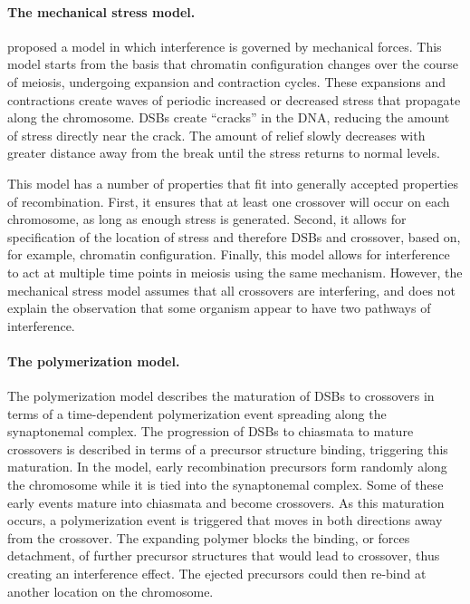 
\paragraph{The mechanical stress model.}
\citet{Kleckner2004} proposed a model in which interference is governed by mechanical forces.
This model starts from the basis that chromatin configuration changes over the course of meiosis, undergoing expansion and contraction cycles.
These expansions and contractions create waves of periodic increased or decreased stress that propagate along the chromosome.
DSBs create ``cracks'' in the DNA, reducing the amount of stress directly near the crack.
The amount of relief slowly decreases with greater distance away from the break until the stress returns to normal levels.

This model has a number of properties that fit into generally accepted properties of recombination.
First, it ensures that at least one crossover will occur on each chromosome, as long as enough stress is generated.
Second, it allows for specification of the location of stress and therefore DSBs and crossover, based on, for example, chromatin configuration.
Finally, this model allows for interference to act at multiple time points in meiosis using the same mechanism.
However, the mechanical stress model assumes that all crossovers are interfering, and does not explain the observation that some organism appear to have two pathways of interference.

\paragraph{The polymerization model.}
The polymerization model describes the maturation of DSBs to crossovers in terms of a time-dependent polymerization event spreading along the synaptonemal complex\cite{King1990}.
The progression of DSBs to chiasmata to mature crossovers is described in terms of a precursor structure binding, triggering this maturation.
In the model, early recombination precursors form randomly along the chromosome while it is tied into the synaptonemal complex.
Some of these early events mature into chiasmata and become crossovers.
As this maturation occurs, a polymerization event is triggered that moves in both directions away from the crossover.
The expanding polymer blocks the binding, or forces detachment, of further precursor structures that would lead to crossover, thus creating an interference effect.
The ejected precursors could then re-bind at another location on the chromosome.

